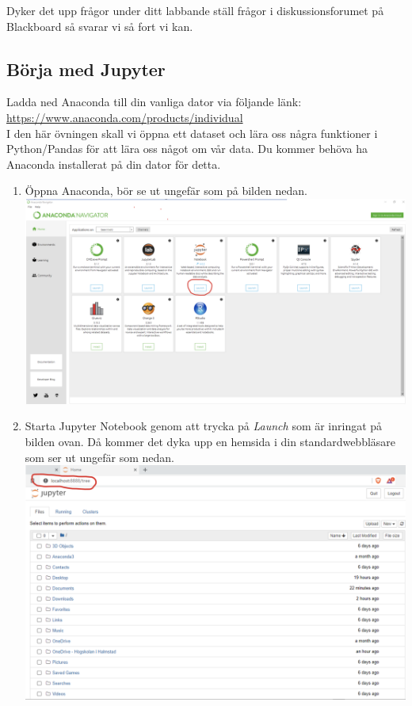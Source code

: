 \documentclass{article}
\begin{document}
Dyker det upp frågor under ditt labbande ställ frågor i diskussionsforumet på Blackboard så svarar vi så fort vi kan.
\subsection{Börja med Jupyter}
Ladda ned Anaconda till din vanliga dator via följande länk:\\
\url{https://www.anaconda.com/products/individual}\\
I den här övningen skall vi öppna ett dataset och lära oss några funktioner i Python/Pandas för att lära oss något om vår data. Du kommer behöva ha Anaconda installerat på din dator för detta.  
\begin{enumerate}
\item Öppna Anaconda, bör se ut ungefär som på bilden nedan.\\
  \includegraphics[width=\textwidth]{figures/anaconda1.png}
\item Starta Jupyter Notebook genom att trycka på \emph{Launch} som är inringat på bilden ovan. Då kommer det dyka upp en hemsida i din standardwebbläsare som ser ut ungefär som nedan.\\
  \includegraphics[width=\textwidth]{figures/anaconda2.png}\\

\end{enumerate}
\end{document}
